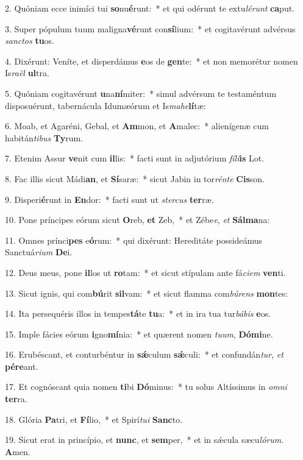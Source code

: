2. Quóniam ecce inimíci tui \textbf{so}nu\textbf{é}runt:~*  et qui odérunt te extu\textit{lé}\textit{runt} \textbf{ca}put.\

3. Super pópulum tuum maligna\textbf{vé}runt con\textbf{sí}lium:~*  et cogitavérunt advérsus \textit{sanc}\textit{tos} \textbf{tu}os.\

4. Dixérunt: Veníte, et disperdámus \textbf{e}os de \textbf{gen}te:~*  et non memorétur nomen Is\textit{ra}\textit{ël} \textbf{ul}tra.\

5. Quóniam cogitavérunt \textbf{u}na\textbf{ní}miter:~*  simul advérsum te testaméntum disposuérunt, tabernácula Idumæórum et Is\textit{ma}\textit{he}\textbf{lí}tæ:\

6. Moab, et Agaréni, Gebal, et \textbf{Am}mon, et \textbf{A}malec:~*  alienígenæ cum habitán\textit{ti}\textit{bus} \textbf{Ty}rum.\

7. Etenim Assur \textbf{ve}nit cum \textbf{il}lis:~*  facti sunt in adjutórium \textit{fí}\textit{li}\textbf{is} Lot.\

8. Fac illis sicut Mádi\textbf{an}, et \textbf{Sí}saræ:~*  sicut Jabin in tor\textit{rén}\textit{te} \textbf{Cis}son.\

9. Disperi\textbf{é}runt in \textbf{En}dor:~*  facti sunt ut \textit{ster}\textit{cus} \textbf{ter}ræ.\

10. Pone príncipes eórum sicut \textbf{O}reb, \textbf{et} Zeb,~*  et Zébe\textit{e}, \textit{et} \textbf{Sál}\textbf{ma}na:\

11. Omnes prínci\textbf{pes} e\textbf{ó}rum:~*  qui dixérunt: Hereditáte possideámus Sanctuá\textit{ri}\textit{um} \textbf{De}i.\

12. Deus meus, pone \textbf{il}los ut \textbf{ro}tam:~*  et sicut stípulam ante fá\textit{ci}\textit{em} \textbf{ven}ti.\

13. Sicut ignis, qui com\textbf{bú}rit \textbf{sil}vam:~*  et sicut flamma com\textit{bú}\textit{rens} \textbf{mon}tes:\

14. Ita persequéris illos in tempes\textbf{tá}te \textbf{tu}a:~*  et in ira tua tur\textit{bá}\textit{bis} \textbf{e}os.\

15. Imple fácies eórum \textbf{i}gno\textbf{mí}nia:~*  et quærent nomen \textit{tu}\textit{um}, \textbf{Dó}\textbf{mi}ne.\

16. Erubéscant, et conturbéntur in \textbf{sǽ}culum \textbf{sǽ}culi:~*  et confundán\textit{tur}, \textit{et} \textbf{pér}\textbf{e}ant.\

17. Et cognóscant quia nomen \textbf{ti}bi \textbf{Dó}minus:~*  tu solus Altíssimus in \textit{om}\textit{ni} \textbf{ter}ra.\

18. Glória \textbf{Pa}tri, et \textbf{Fí}lio,~*  et Spirí\textit{tu}\textit{i} \textbf{Sanc}to.\

19. Sicut erat in princípio, et \textbf{nunc}, et \textbf{sem}per,~*  et in sǽcula sæcu\textit{ló}\textit{rum}. \textbf{A}men.\


